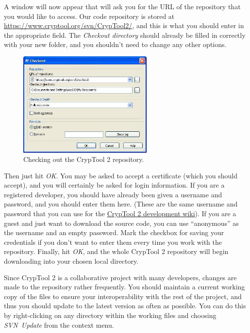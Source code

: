 A window will now appear that will ask you for the URL of the repository that you would like to access. Our code repository is stored at \url{https://www.cryptool.org/svn/CrypTool2/}, and this is what you should enter in the appropriate field. The \textit{Checkout directory} should already be filled in correctly with your new folder, and you shouldn't need to change any other options.

\begin{figure}[h!]
	\centering
		\includegraphics[width=0.60\textwidth]{figures/tortoise_svn_checkout2.jpg}
	\caption{Checking out the CrypTool 2 repository.}
	\label{fig:tortoise_svn_checkout2}
\end{figure}

Then just hit \textit{OK}. You may be asked to accept a certificate (which you should accept), and you will certainly be asked for login information. If you are a registered developer, you should have already been given a username and password, and you should enter them here. (These are the same username and password that you can use for the \href{https://www.cryptool.org/trac/CrypTool2/wiki/WikiStart}{CrypTool 2 development wiki}). If you are a guest and just want to download the source code, you can use ``anonymous'' as the username and an empty password. Mark the checkbox for saving your credentials if you don't want to enter them every time you work with the repository. Finally, hit \textit{OK}, and the whole CrypTool 2 repository will begin downloading into your chosen local directory.

Since CrypTool 2 is a collaborative project with many developers, changes are made to the repository rather frequently. You should maintain a current working copy of the files to ensure your interoperability with the rest of the project, and thus you should update to the latest version as often as possible. You can do this by right-clicking on any directory within the working files and choosing \textit{SVN~Update} from the context menu.

